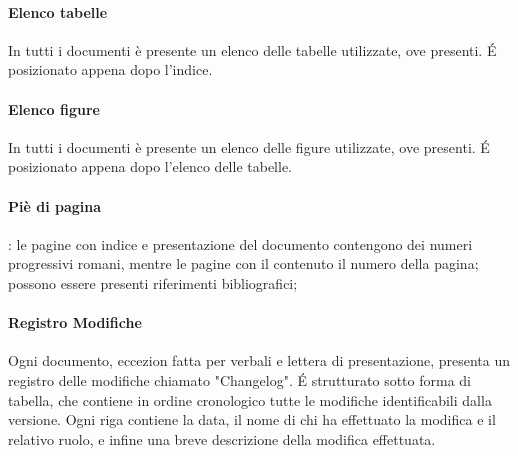 \paragraph{Elenco tabelle\\}
In tutti i documenti è presente un elenco delle tabelle utilizzate, ove presenti. \'E posizionato appena dopo l'indice.  

\paragraph{Elenco figure\\}
In tutti i documenti è presente un elenco delle figure utilizzate, ove presenti. \'E posizionato appena dopo l'elenco delle tabelle.

\paragraph{Piè di pagina}: le pagine con indice e presentazione del documento contengono dei numeri progressivi romani, mentre le pagine con il contenuto il numero della pagina; possono essere presenti riferimenti bibliografici;

\paragraph{Registro Modifiche\\}
Ogni documento, eccezion fatta per verbali e lettera di presentazione, presenta un registro delle modifiche chiamato "Changelog". \'E strutturato sotto forma di tabella, che contiene in ordine cronologico tutte le modifiche identificabili dalla versione.  Ogni riga contiene la data, il nome di chi ha effettuato la modifica e il relativo ruolo, e infine una breve descrizione della modifica effettuata.

